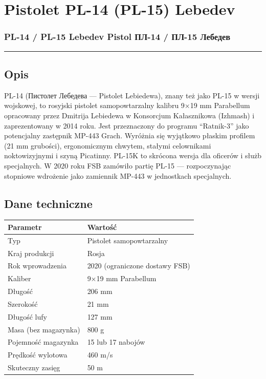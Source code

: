\documentclass[12pt,openany,oneside]{book}
\begin{document}
\chapter{Pistolet PL-14 (PL-15)
Lebedev}\label{pistolet-pl-14-pl-15-lebedev}

\subsection{PL-14 / PL-15 Lebedev Pistol \textbar{} ПЛ-14 / ПЛ-15
Лебедев}\label{pl-14-pl-15-lebedev-pistol-ux43fux43b-14-ux43fux43b-15-ux43bux435ux431ux435ux434ux435ux432}

\begin{center}\rule{0.5\linewidth}{0.5pt}\end{center}

\section{Opis}\label{opis-98}

PL-14 (Пистолет Лебедева --- Pistolet Lebiedewa), znany też jako PL-15 w
wersji wojskowej, to rosyjski pistolet samopowtarzalny kalibru 9×19 mm
Parabellum opracowany przez Dmitrija Lebiedewa w Konsorcjum Kałasznikowa
(Izhmash) i zaprezentowany w 2014 roku. Jest przeznaczony do programu
``Ratnik-3'' jako potencjalny zastępnik MP-443 Grach. Wyróżnia się
wyjątkowo płaskim profilem (21 mm grubości), ergonomicznym chwytem,
stałymi celownikami noktowizyjnymi i szyną Picatinny. PL-15K to skrócona
wersja dla oficerów i służb specjalnych. W 2020 roku FSB zamówiło partię
PL-15 --- rozpoczynając stopniowe wdrożenie jako zamiennik MP-443 w
jednostkach specjalnych.

\section{Dane techniczne}\label{dane-techniczne-98}

\begin{longtable}[]{@{}ll@{}}
\toprule\noalign{}
Parametr & Wartość \\
\midrule\noalign{}
\endhead
\bottomrule\noalign{}
\endlastfoot
Typ & Pistolet samopowtarzalny \\
Kraj produkcji & Rosja \\
Rok wprowadzenia & 2020 (ograniczone dostawy FSB) \\
Kaliber & 9×19 mm Parabellum \\
Długość & 206 mm \\
Szerokość & 21 mm \\
Długość lufy & 127 mm \\
Masa (bez magazynka) & 800 g \\
Pojemność magazynka & 15 lub 17 nabojów \\
Prędkość wylotowa & 460 m/s \\
Skuteczny zasięg & 50 m \\
\end{longtable}
\end{document}
